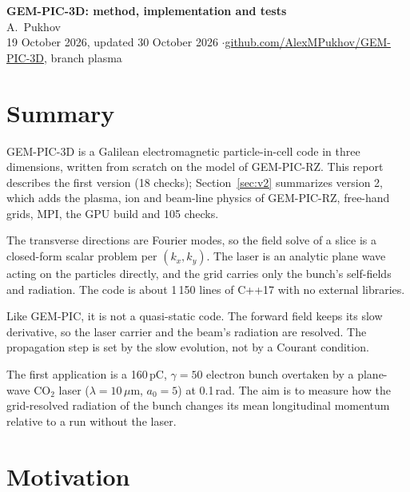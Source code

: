\documentclass[11pt,a4paper]{article}
\newcommand{\code}[1]{{\fontencoding{OT1}\fontfamily{cmtt}\selectfont #1}}
\begin{document}
\begin{center}
{\LARGE\bfseries GEM-PIC-3D: method, implementation and tests}\\[1.2ex]
{\large A.~Pukhov}\\[0.6ex]
{\small 19 October 2026, updated 30 October 2026 \quad$\cdot$\quad \href{https://github.com/AlexMPukhov/GEM-PIC-3D}{github.com/AlexMPukhov/GEM-PIC-3D}, branch \code{plasma}}
\end{center}
\vspace{1ex}

\section{Summary}

GEM-PIC-3D is a Galilean electromagnetic particle-in-cell code in three dimensions, written from scratch on the model of GEM-PIC-RZ. This report describes the first version (18 checks); Section~\ref{sec:v2} summarizes version 2, which adds the plasma, ion and beam-line physics of GEM-PIC-RZ, free-hand grids, MPI, the GPU build and 105 checks.

The transverse directions are Fourier modes, so the field solve of a slice is a closed-form scalar problem per $(k_x,k_y)$. The laser is an analytic plane wave acting on the particles directly, and the grid carries only the bunch's self-fields and radiation. The code is about 1\,150 lines of C++17 with no external libraries.

Like GEM-PIC, it is not a quasi-static code. The forward field keeps its slow derivative, so the laser carrier and the beam's radiation are resolved. The propagation step is set by the slow evolution, not by a Courant condition.

The first application is a 160\,pC, $\gamma=50$ electron bunch overtaken by a plane-wave CO$_2$ laser ($\lambda=10\,\mu$m, $a_0=5$) at 0.1\,rad. The aim is to measure how the grid-resolved radiation of the bunch changes its mean longitudinal momentum relative to a run without the laser.

\section{Motivation}
\end{document}
